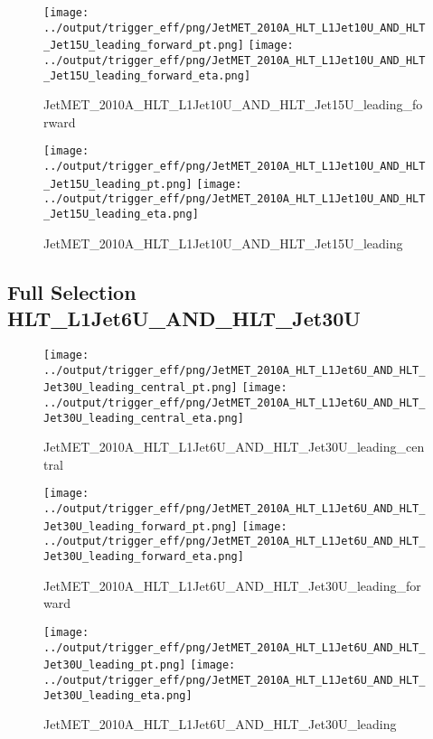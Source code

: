 \documentclass[11pt]{article}
\begin{document}
\begin{figure}[ht]
\centering
\texttt{[image: ../output/trigger\_eff/png/JetMET\_2010A\_HLT\_L1Jet10U\_AND\_HLT\_Jet15U\_leading\_forward\_pt.png]}
\texttt{[image: ../output/trigger\_eff/png/JetMET\_2010A\_HLT\_L1Jet10U\_AND\_HLT\_Jet15U\_leading\_forward\_eta.png]}
\caption{JetMET\_2010A\_HLT\_L1Jet10U\_AND\_HLT\_Jet15U\_leading\_forward}
\label{fig:jetmet_L1Jet10U_AND_HLT_Jet15U_leading_forward}
\end{figure}

\begin{figure}[ht]
\centering
\texttt{[image: ../output/trigger\_eff/png/JetMET\_2010A\_HLT\_L1Jet10U\_AND\_HLT\_Jet15U\_leading\_pt.png]}
\texttt{[image: ../output/trigger\_eff/png/JetMET\_2010A\_HLT\_L1Jet10U\_AND\_HLT\_Jet15U\_leading\_eta.png]}
\caption{JetMET\_2010A\_HLT\_L1Jet10U\_AND\_HLT\_Jet15U\_leading}
\label{fig:jetmet_L1Jet10U_AND_HLT_Jet15U_leading}
\end{figure}

\newpage
\subsection{Full Selection HLT\_L1Jet6U\_AND\_HLT\_Jet30U}
\begin{figure}[ht]
\centering
\texttt{[image: ../output/trigger\_eff/png/JetMET\_2010A\_HLT\_L1Jet6U\_AND\_HLT\_Jet30U\_leading\_central\_pt.png]}
\texttt{[image: ../output/trigger\_eff/png/JetMET\_2010A\_HLT\_L1Jet6U\_AND\_HLT\_Jet30U\_leading\_central\_eta.png]}
\caption{JetMET\_2010A\_HLT\_L1Jet6U\_AND\_HLT\_Jet30U\_leading\_central}
\label{fig:jetmet_L1Jet6U_AND_HLT_Jet30U_leading_central}
\end{figure}

\begin{figure}[ht]
\centering
\texttt{[image: ../output/trigger\_eff/png/JetMET\_2010A\_HLT\_L1Jet6U\_AND\_HLT\_Jet30U\_leading\_forward\_pt.png]}
\texttt{[image: ../output/trigger\_eff/png/JetMET\_2010A\_HLT\_L1Jet6U\_AND\_HLT\_Jet30U\_leading\_forward\_eta.png]}
\caption{JetMET\_2010A\_HLT\_L1Jet6U\_AND\_HLT\_Jet30U\_leading\_forward}
\label{fig:jetmet_L1Jet6U_AND_HLT_Jet30U_leading_forward}
\end{figure}

\begin{figure}[ht]
\centering
\texttt{[image: ../output/trigger\_eff/png/JetMET\_2010A\_HLT\_L1Jet6U\_AND\_HLT\_Jet30U\_leading\_pt.png]}
\texttt{[image: ../output/trigger\_eff/png/JetMET\_2010A\_HLT\_L1Jet6U\_AND\_HLT\_Jet30U\_leading\_eta.png]}
\caption{JetMET\_2010A\_HLT\_L1Jet6U\_AND\_HLT\_Jet30U\_leading}
\label{fig:jetmet_L1Jet6U_AND_HLT_Jet30U_leading}
\end{figure}
\end{document}
